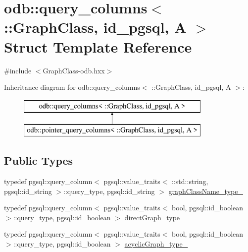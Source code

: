 \hypertarget{structodb_1_1query__columns_3_01_1_1_graph_class_00_01id__pgsql_00_01_a_01_4}{}\section{odb\+:\+:query\+\_\+columns$<$ \+:\+:Graph\+Class, id\+\_\+pgsql, A $>$ Struct Template Reference}
\label{structodb_1_1query__columns_3_01_1_1_graph_class_00_01id__pgsql_00_01_a_01_4}


{\ttfamily \#include $<$Graph\+Class-\/odb.\+hxx$>$}

Inheritance diagram for odb\+:\+:query\+\_\+columns$<$ \+:\+:Graph\+Class, id\+\_\+pgsql, A $>$\+:\begin{figure}[H]
\begin{center}
\leavevmode
\includegraphics[height=2.000000cm]{d1/ddd/structodb_1_1query__columns_3_01_1_1_graph_class_00_01id__pgsql_00_01_a_01_4}
\end{center}
\end{figure}
\subsection*{Public Types}
\begin{DoxyCompactItemize}
\item 
typedef pgsql\+::query\+\_\+column$<$ pgsql\+::value\+\_\+traits$<$ \+::std\+::string, pgsql\+::id\+\_\+string $>$\+::query\+\_\+type, pgsql\+::id\+\_\+string $>$ \hyperlink{structodb_1_1query__columns_3_01_1_1_graph_class_00_01id__pgsql_00_01_a_01_4_a0998d9f21c582558ae69233ba203660c}{graph\+Class\+Name\+\_\+type\+\_\+}
\item 
typedef pgsql\+::query\+\_\+column$<$ pgsql\+::value\+\_\+traits$<$ bool, pgsql\+::id\+\_\+boolean $>$\+::query\+\_\+type, pgsql\+::id\+\_\+boolean $>$ \hyperlink{structodb_1_1query__columns_3_01_1_1_graph_class_00_01id__pgsql_00_01_a_01_4_a3b4293c0e680aa0f73c18e5514533828}{direct\+Graph\+\_\+type\+\_\+}
\item 
typedef pgsql\+::query\+\_\+column$<$ pgsql\+::value\+\_\+traits$<$ bool, pgsql\+::id\+\_\+boolean $>$\+::query\+\_\+type, pgsql\+::id\+\_\+boolean $>$ \hyperlink{structodb_1_1query__columns_3_01_1_1_graph_class_00_01id__pgsql_00_01_a_01_4_a15c7205e42b439b2a8de75a2e76491a7}{acyclic\+Graph\+\_\+type\+\_\+}
\end{DoxyCompactItemize}
